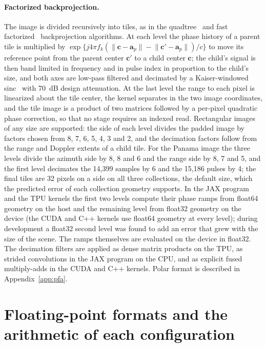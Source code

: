 \documentclass[11pt]{article}
\begin{document}
\paragraph{Factorized backprojection.} The image is divided recursively into tiles, as in the quadtree~\cite{mccorkle1996,xiao2000} and fast factorized~\cite{ulander2003} backprojection algorithms. At each level the phase history of a parent tile is multiplied by $\exp\{j 4\pi f_k (\lVert \mathbf{c} - \mathbf{a}_p \rVert - \lVert \mathbf{c}' - \mathbf{a}_p \rVert)/c\}$ to move its reference point from the parent center $\mathbf{c}'$ to a child center $\mathbf{c}$; the child's signal is then band limited in frequency and in pulse index in proportion to the child's size, and both axes are low-pass filtered and decimated by a Kaiser-windowed sinc~\cite{kaiser1974} with 70~dB design attenuation. At the last level the range to each pixel is linearized about the tile center, the kernel separates in the two image coordinates, and the tile image is a product of two matrices followed by a per-pixel quadratic phase correction, so that no stage requires an indexed read. Rectangular images of any size are supported: the side of each level divides the padded image by factors chosen from 8, 7, 6, 5, 4, 3 and 2, and the decimation factors follow from the range and Doppler extents of a child tile. For the Panama image the three levels divide the azimuth side by 8, 8 and 6 and the range side by 8, 7 and 5, and the first level decimates the 14,399 samples by 6 and the 15,186 pulses by 4; the final tiles are 32 pixels on a side on all three collections, the default size, which the predicted error of each collection geometry supports. In the JAX program and the TPU kernels the first two levels compute their phase ramps from float64 geometry on the host and the remaining level from float32 geometry on the device (the CUDA and C++ kernels use float64 geometry at every level); during development a float32 second level was found to add an error that grew with the size of the scene. The ramps themselves are evaluated on the device in float32. The decimation filters are applied as dense matrix products on the TPU, as strided convolutions in the JAX program on the CPU, and as explicit fused multiply-adds in the CUDA and C++ kernels. Polar format is described in Appendix~\ref{app:pfa}.

\section{Floating-point formats and the arithmetic of each configuration}
\label{app:formats}
\end{document}
